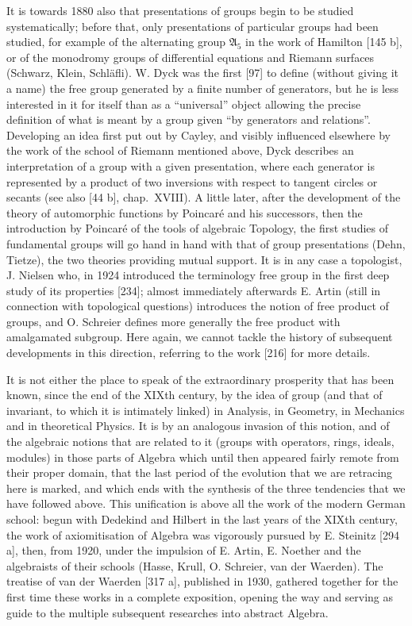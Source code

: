 It is towards 1880 also that presentations of groups begin to be studied systematically; before that, only presentations of particular groups had been studied, for example of the alternating group \(\mathfrak{A}_5\) in the work of Hamilton {[}145 b{]}, or of the monodromy groups of differential equations and Riemann surfaces (Schwarz, Klein, Schläfli). W. Dyck was the first {[}97{]} to define (without giving it a name) the free group generated by a finite number of generators, but he is less interested in it for itself than as a ``universal'' object allowing the precise definition of what is meant by a group given ``by generators and relations''. Developing an idea first put out by Cayley, and visibly influenced elsewhere by the work of the school of Riemann mentioned above, Dyck describes an interpretation of a group with a given presentation, where each generator is represented by a product of two inversions with respect to tangent circles or secants (see also {[}44 b{]}, chap.~XVIII). A little later, after the development of the theory of automorphic functions by Poincaré and his successors, then the introduction by Poincaré of the tools of algebraic Topology, the first studies of fundamental groups will go hand in hand with that of group presentations (Dehn, Tietze), the two theories providing mutual support. It is in any case a topologist, J. Nielsen who, in 1924 introduced the terminology free group in the first deep study of its properties {[}234{]}; almost immediately afterwards E. Artin (still in connection with topological questions) introduces the notion of free product of groups, and O. Schreier defines more generally the free product with amalgamated subgroup. Here again, we cannot tackle the history of subsequent developments in this direction, referring to the work {[}216{]} for more details.

It is not either the place to speak of the extraordinary prosperity that has been known, since the end of the XIXth century, by the idea of group (and that of invariant, to which it is intimately linked) in Analysis, in Geometry, in Mechanics and in theoretical Physics. It is by an analogous invasion of this notion, and of the algebraic notions that are related to it (groups with operators, rings, ideals, modules) in those parts of Algebra which until then appeared fairly remote from their proper domain, that the last period of the evolution that we are retracing here is marked, and which ends with the synthesis of the three tendencies that we have followed above. This unification is above all the work of the modern German school: begun with Dedekind and Hilbert in the last years of the XIXth century, the work of axiomitisation of Algebra was vigorously pursued by E. Steinitz {[}294 a{]}, then, from 1920, under the impulsion of E. Artin, E. Noether and the algebraists of their schools (Hasse, Krull, O. Schreier, van der Waerden). The treatise of van der Waerden {[}317 a{]}, published in 1930, gathered together for the first time these works in a complete exposition, opening the way and serving as guide to the multiple subsequent researches into abstract Algebra.
